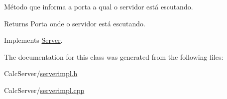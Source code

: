 Método que informa a porta a qual o servidor está escutando. 

\begin{DoxyReturn}{Returns}
Porta onde o servidor está escutando. 
\end{DoxyReturn}


Implements \hyperlink{classServer_ad32766e2608017d9fcd0903ab3748803}{Server}.



The documentation for this class was generated from the following files\+:\begin{DoxyCompactItemize}
\item 
Calc\+Server/\hyperlink{serverimpl_8h}{serverimpl.\+h}\item 
Calc\+Server/\hyperlink{serverimpl_8cpp}{serverimpl.\+cpp}\end{DoxyCompactItemize}
